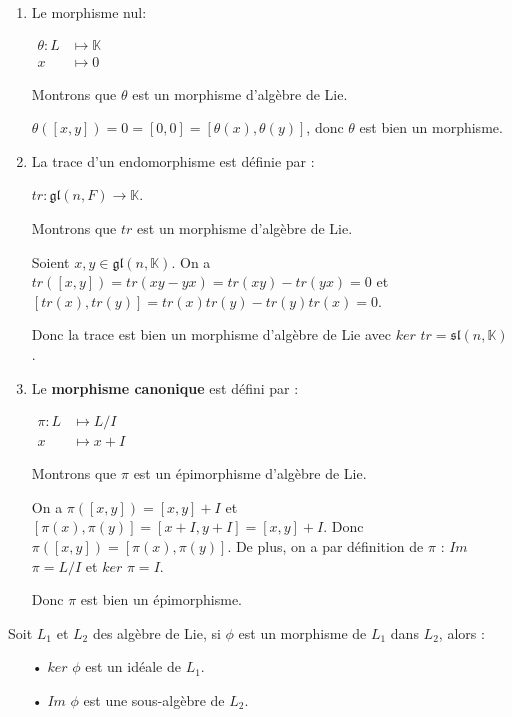 \documentclass[a4paper,openany,12pt]{report}
\newcommand{\KK}{\mathbb{K}}
\newcommand{\gl}{\mathfrak{gl}}
\newcommand{\ssl}{\mathfrak{sl}}
\theoremstyle{break}
{\theorembodyfont{\upshape}
\newtheorem*{rmq}{Remarque :}
\newtheorem*{prv}{Preuve :}
\newtheorem*{ex}{Exemples :}
\newtheorem{exe}{Exemple : }
\newtheorem*{nota}{Notation :}}
\begin{document}
\begin{ex}
\begin{enumerate}

\item Le morphisme nul:
\begin{center} 
$\begin{aligned} \theta: L & \longmapsto \KK \\ x & \longmapsto 0 \end{aligned}$
\end{center}
Montrons que $\theta$ est un morphisme d'algèbre de Lie.

$\theta([x,y]) = 0 = [0,0] = [\theta(x),\theta(y)]$, donc $\theta$ est bien un morphisme.

\item La trace d'un endomorphisme est définie par :
\begin{center}
$tr: \gl(n,F) \longrightarrow \KK$.
\end{center}
Montrons que $tr$ est un morphisme d’algèbre de Lie.

Soient $x,y \in  \gl(n,\KK)$. On a $tr([x,y]) = tr(xy-yx) = tr(xy)-tr(yx) = 0$
et $[tr(x),tr(y)] = tr(x)tr(y)-tr(y)tr(x) = 0$.

Donc la trace est bien un morphisme d'algèbre de Lie avec $ker$ $tr = \ssl(n,\KK)$.

\item Le \textbf{morphisme canonique} est défini par : 
\begin{center}
$\begin{aligned} \pi: L & \longmapsto L/I \\ x & \longmapsto x+I\end{aligned}$
\end{center}
Montrons que $\pi$ est un épimorphisme d'algèbre de Lie.

On a $\pi([x,y]) = [x,y]+I$ et $[\pi(x),\pi(y)] = [x+I,y+I] = [x,y]+I$. Donc $\pi([x,y]) = [\pi(x),\pi(y)]$. De plus, on a par définition de $\pi$ : $Im$ $\pi = L/I$ et $ker$ $\pi = I$.

Donc $\pi$ est bien un épimorphisme.
\end{enumerate}
\end{ex}

\begin{rmq}
\quad Soit $L_{1}$ et $L_{2}$ des algèbre de Lie, si $\phi$ est un morphisme de $L_{1}$ dans $L_{2}$, alors :
\begin{itemize}
\item[•] $ker$ $\phi$ est un idéale de $L_{1}$.
\item[•] $Im$ $\phi$ est une sous-algèbre de $L_{2}$.
\end{itemize}
\end{rmq}
\end{document}
